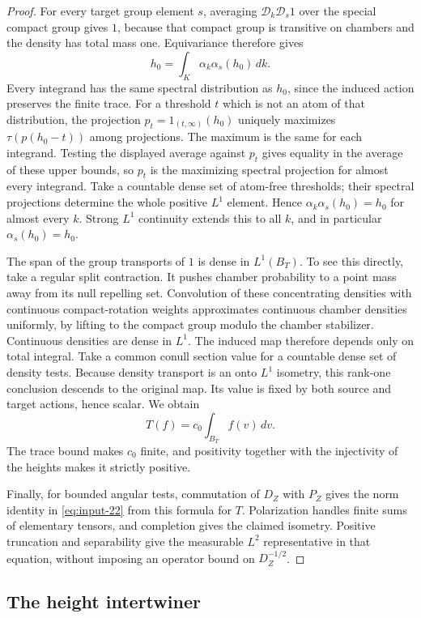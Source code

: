 \begin{proof}
For every target group element $s$, averaging $\mathcal D_k\mathcal D_s1$
over the special compact group gives $1$, because that compact group is
transitive on chambers and the density has total mass one.  Equivariance
therefore gives
\[
 h_0=\int_K\alpha_k\alpha_s(h_0)\,dk.
\]
Every integrand has the same spectral distribution as $h_0$, since the
induced action preserves the finite trace.  For a threshold $t$ which is
not an atom of that distribution, the projection
$p_t=1_{(t,\infty)}(h_0)$ uniquely maximizes
$\tau(p(h_0-t))$ among projections.  The maximum is the same for each
integrand.  Testing the displayed average against $p_t$ gives equality in
the average of these upper bounds, so $p_t$ is the maximizing spectral
projection for almost every integrand.  Take a countable dense set of
atom-free thresholds; their spectral projections determine the whole
positive $L^1$ element.  Hence
$\alpha_k\alpha_s(h_0)=h_0$ for almost every $k$.  Strong $L^1$ continuity
extends this to all $k$, and in particular $\alpha_s(h_0)=h_0$.

The span of the group transports of $1$ is dense in $L^1(B_T)$.  To see
this directly, take a regular split contraction.  It pushes chamber
probability to a point mass away from its null repelling set.  Convolution
of these concentrating densities with continuous compact-rotation weights
approximates continuous chamber densities uniformly, by lifting to the
compact group modulo the chamber stabilizer.  Continuous densities are
dense in $L^1$.  The induced map therefore depends only on total integral.
Take a common conull section value for a countable dense set of density
tests.  Because density transport is an onto $L^1$ isometry, this
rank-one conclusion descends to the original map.  Its value is fixed by
both source and target actions, hence scalar.  We obtain
\[
 T(f)=c_0\int_{B_T} f(v)\,dv.
\]
The trace bound makes $c_0$ finite, and positivity together with the
injectivity of the heights makes it strictly positive.

Finally, for bounded angular tests, commutation of $D_Z$ with $P_Z$ gives
the norm identity in \eqref{eq:input-22} from this formula for $T$.
Polarization handles finite sums of elementary tensors, and completion
gives the claimed isometry.  Positive truncation and separability give the
measurable $L^2$ representative in that equation, without imposing an
operator bound on $D_Z^{-1/2}$.
\end{proof}

\subsection{The height intertwiner}

